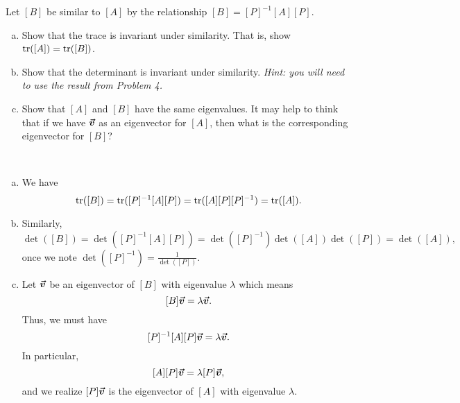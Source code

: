 \documentclass[12pt]{article} %
\begin{document}
\newpage
\begin{problem}
Let $[B]$ be similar to $[A]$ by the relationship $[B]=[P]^{-1} [A] [P]$.  
\begin{enumerate}[(a)]
    \item Show that the trace is invariant under similarity. That is, show $\mathrm{tr} ([A]) = \mathrm{tr}([B])$.
    \item Show that the determinant is invariant under similarity. \emph{Hint: you will need to use the result from Problem 4.}
    \item Show that $[A]$ and $[B]$ have the same eigenvalues. It may help to think that if we have $\boldsymbol{\boldsymbol{\vec{v}}}$ as an eigenvector for $[A]$, then what is the corresponding eigenvector for $[B]$?
\end{enumerate}
\end{problem}
\begin{solution}~
    \begin{enumerate}[(a)]
        \item We have
        \[
        \mathrm{tr}([B])=\mathrm{tr}([P]^{-1}[A][P]) = \mathrm{tr}([A][P][P]^{-1}) = \mathrm{tr}([A]).
        \]
        \item Similarly,
        \[
        \det([B])=\det([P]^{-1} [A] [P]) = \det([P]^{-1}) \det([A]) \det([P]) = \det([A]),
        \]
        once we note $\det([P]^{-1}) = \frac{1}{\det([P])}$.
        \item Let $\boldsymbol{\boldsymbol{\vec{v}}}$ be an eigenvector of $[B]$ with eigenvalue $\lambda$ which means
        \[
        [B]\boldsymbol{\boldsymbol{\vec{v}}} = \lambda \boldsymbol{\boldsymbol{\vec{v}}}.
        \]
        Thus, we must have
        \[
        [P]^{-1} [A] [P] \boldsymbol{\boldsymbol{\vec{v}}} = \lambda \boldsymbol{\boldsymbol{\vec{v}}}.
        \]
        In particular,
        \[
        [A] [P] \boldsymbol{\boldsymbol{\vec{v}}} = \lambda [P]\boldsymbol{\boldsymbol{\vec{v}}},
        \]
        and we realize $[P]\boldsymbol{\boldsymbol{\vec{v}}}$ is the eigenvector of $[A]$ with eigenvalue $\lambda$.
    \end{enumerate}
\end{solution}
\end{document}
